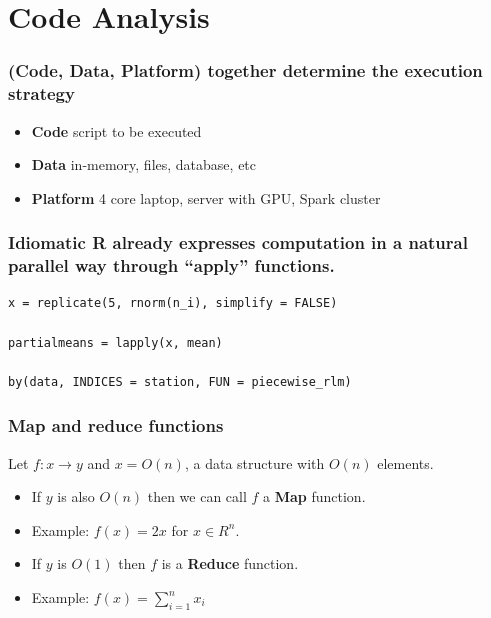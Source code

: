\documentclass{beamer}
\begin{document}
\section{Code Analysis}
\begin{frame}

    \frametitle{(Code, Data, Platform) together determine the execution
    strategy}

    \begin{itemize}
    \item \textbf{Code} script to be executed
    \item \textbf{Data} in-memory, files, database, etc
    \item \textbf{Platform} 4 core laptop, server with GPU, Spark cluster

    \end{itemize}

\end{frame}
\begin{frame}[fragile]

    \frametitle{Idiomatic R already expresses computation in a natural
    parallel way through ``apply'' functions.}

\begin{verbatim}
x = replicate(5, rnorm(n_i), simplify = FALSE)

partialmeans = lapply(x, mean)

by(data, INDICES = station, FUN = piecewise_rlm)
\end{verbatim}

\end{frame}
\begin{frame}

    \frametitle{Map and reduce functions}

    Let $f: x \rightarrow y$ and $x = O(n)$, a data structure with $O(n)$
    elements.

    \begin{itemize}
        \item If $y$ is also $O(n)$ then we can call $f$ a \textbf{Map} function.

        \item Example: $f(x) = 2x$ for $x \in R^n$.

    
        \item If $y$ is $O(1)$ then $f$ is a \textbf{Reduce} function.

        \item Example: $f(x) = \sum_{i = 1}^n x_i$
    \end{itemize}

\end{frame}
\end{document}

